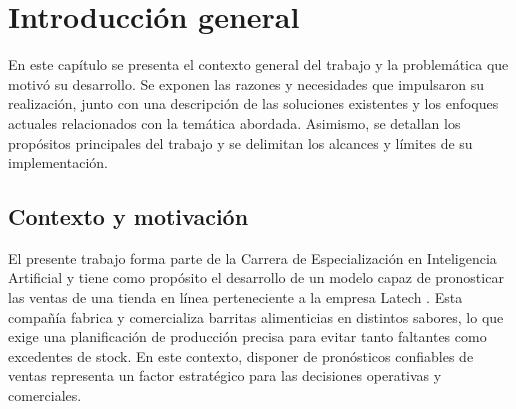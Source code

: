 
\chapter{Introducción general} %

\label{Chapter1} %
\label{IntroGeneral}

En este capítulo se presenta el contexto general del trabajo y la problemática que motivó su desarrollo. Se exponen las razones y necesidades que impulsaron su realización, junto con una descripción de las soluciones existentes y los enfoques actuales relacionados con la temática abordada. Asimismo, se detallan los propósitos principales del trabajo y se delimitan los alcances y límites de su implementación.


\newcommand{\keyword}[1]{\textbf{#1}}
\newcommand{\tabhead}[1]{\textbf{#1}}
\newcommand{\code}[1]{\texttt{#1}}
\newcommand{\file}[1]{\texttt{\bfseries#1}}
\newcommand{\option}[1]{\texttt{\itshape#1}}
\newcommand{\grados}{$^{\circ}$}

\section{Contexto y motivación}

El presente trabajo forma parte de la Carrera de Especialización en Inteligencia Artificial y tiene como propósito el desarrollo de un modelo capaz de pronosticar las ventas de una tienda en línea perteneciente a la empresa Latech \citep{latechfactory}. Esta compañía fabrica y comercializa barritas alimenticias en distintos sabores, lo que exige una planificación de producción precisa para evitar tanto faltantes como excedentes de stock. En este contexto, disponer de pronósticos confiables de ventas representa un factor estratégico para las decisiones operativas y comerciales.

